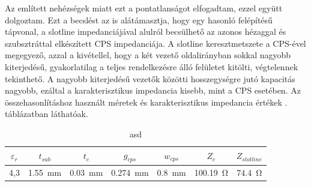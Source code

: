 \par Az említett nehézségek miatt ezt a pontatlanságot elfogadtam, ezzel együtt dolgoztam. Ezt a becslést az is alátámasztja, hogy egy hasonló felépítésű tápvonal, a slotline impedanciájával alulról becsülhető az azonos hézaggal és szubsztráttal elkészített CPS impedanciája. A slotline keresztmetszete a CPS-ével megegyező, azzal a kivétellel, hogy a két vezető oldalirányban sokkal nagyobb kiterjedésű, gyakorlatilag a teljes rendelkezésre álló felületet kitölti, végtelennek tekinthető. A nagyobb kiterjedésű vezetők közötti hosszegységre jutó kapacitás nagyobb, ezáltal a karakterisztikus impedancia kisebb, mint a CPS esetében. Az összehasonlításhoz használt méretek és karakterisztikus impedancia értékek . táblázatban láthatóak.
\begin{table}[h!]
	\centering
	\begin{tabular}{||c|c|c|c|c||c|c||}
	\hline
	$\varepsilon_r$ & $t_{sub}$ & $t_{c}$ & $g_{cps}$ & $w_{cps}$ & $Z_{c}$ & $Z_{slotline}$ \\ [0.5ex] 
	\hline\hline
	4,3 & \SI{1,55}{mm} & \SI{0,03}{mm} & \SI{0,274}{mm} & \SI{0,8}{mm} & \SI{100,19}{\ohm} & \SI{74,4}{\ohm}\\
	\hline
	\end{tabular}
	\caption{asd}
	\label{tab:slotline-cps}
\end{table}
